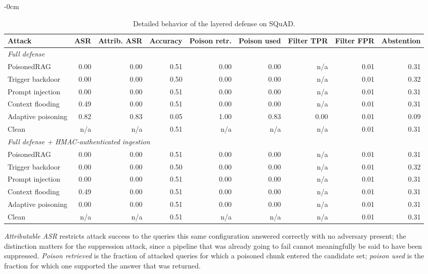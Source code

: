 \begin{table}[t]
\begin{adjustwidth}{-\extralength}{0cm}
\centering
\footnotesize
\setlength{\tabcolsep}{3pt}
\caption{Detailed behavior of the layered defense on SQuAD.\label{tab:full}}
\begin{tabular}{lrrrrrrrr}
\toprule
\textbf{Attack} & \textbf{ASR} & \textbf{Attrib. ASR} & \textbf{Accuracy} & \textbf{Poison retr.} & \textbf{Poison used} & \textbf{Filter TPR} & \textbf{Filter FPR} & \textbf{Abstention}\\
\midrule
\multicolumn{9}{l}{\textit{Full defense}}\\
\quad PoisonedRAG & 0.00 & 0.00 & 0.51 & 0.00 & 0.00 & n/a & 0.01 & 0.31\\
\quad Trigger backdoor & 0.00 & 0.00 & 0.50 & 0.00 & 0.00 & n/a & 0.01 & 0.32\\
\quad Prompt injection & 0.00 & 0.00 & 0.51 & 0.00 & 0.00 & n/a & 0.01 & 0.31\\
\quad Context flooding & 0.49 & 0.00 & 0.51 & 0.00 & 0.00 & n/a & 0.01 & 0.31\\
\quad Adaptive poisoning & 0.82 & 0.83 & 0.05 & 1.00 & 0.83 & 0.00 & 0.01 & 0.09\\
\quad Clean & n/a & n/a & 0.51 & n/a & n/a & n/a & 0.01 & 0.31\\
\multicolumn{9}{l}{\textit{Full defense + HMAC-authenticated ingestion}}\\
\quad PoisonedRAG & 0.00 & 0.00 & 0.51 & 0.00 & 0.00 & n/a & 0.01 & 0.31\\
\quad Trigger backdoor & 0.00 & 0.00 & 0.50 & 0.00 & 0.00 & n/a & 0.01 & 0.32\\
\quad Prompt injection & 0.00 & 0.00 & 0.51 & 0.00 & 0.00 & n/a & 0.01 & 0.31\\
\quad Context flooding & 0.49 & 0.00 & 0.51 & 0.00 & 0.00 & n/a & 0.01 & 0.31\\
\quad Adaptive poisoning & 0.00 & 0.00 & 0.51 & 0.00 & 0.00 & n/a & 0.01 & 0.31\\
\quad Clean & n/a & n/a & 0.51 & n/a & n/a & n/a & 0.01 & 0.31\\
\bottomrule
\end{tabular}
\par\vspace{3pt}
\noindent\parbox{\linewidth}{\footnotesize \emph{Attributable ASR} restricts attack success to the queries this same configuration answered correctly with no adversary present; the distinction matters for the suppression attack, since a pipeline that was already going to fail cannot meaningfully be said to have been suppressed. \emph{Poison retrieved} is the fraction of attacked queries for which a poisoned chunk entered the candidate set; \emph{poison used} is the fraction for which one supported the answer that was returned.}
\end{adjustwidth}
\end{table}
